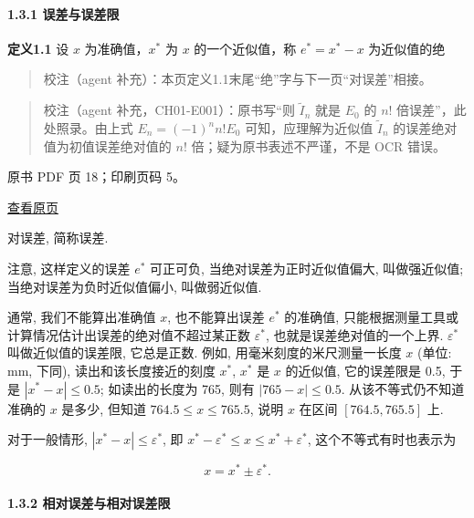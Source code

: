 \paragraph{1.3.1 误差与误差限}\label{ch01-ux8befux5deeux4e0eux8befux5deeux9650}

\textbf{定义1.1} 设 \(x\) 为准确值，\(x^*\) 为 \(x\) 的一个近似值，称 \(e^* = x^* - x\) 为近似值的绝

\begin{quote}
校注（agent 补充）：本页定义1.1末尾``绝''字与下一页``对误差''相接。
\end{quote}

\begin{quote}
校注（agent 补充，CH01-E001）：原书写``则 \(\tilde{I}_n\) 就是 \(E_0\) 的 \(n!\) 倍误差''，此处照录。由上式 \(E_n=(-1)^n n!E_0\) 可知，应理解为近似值 \(\tilde{I}_n\) 的误差绝对值为初值误差绝对值的 \(n!\) 倍；疑为原书表述不严谨，不是 OCR 错误。
\end{quote}

\clearpage

原书 PDF 页 18；印刷页码 5。

\href{source-images/pdf-018.jpeg}{查看原页}

对误差, 简称误差.

注意, 这样定义的误差 \(e^*\) 可正可负, 当绝对误差为正时近似值偏大, 叫做强近似值; 当绝对误差为负时近似值偏小, 叫做弱近似值.

通常, 我们不能算出准确值 \(x\), 也不能算出误差 \(e^*\) 的准确值, 只能根据测量工具或计算情况估计出误差的绝对值不超过某正数 \(\varepsilon^*\), 也就是误差绝对值的一个上界. \(\varepsilon^*\) 叫做近似值的误差限, 它总是正数. 例如, 用毫米刻度的米尺测量一长度 \(x\) (单位: mm, 下同), 读出和该长度接近的刻度 \(x^*\), \(x^*\) 是 \(x\) 的近似值, 它的误差限是 0.5, 于是 \(|x^* - x| \leqslant 0.5\); 如读出的长度为 765, 则有 \(|765 - x| \leqslant 0.5\). 从该不等式仍不知道准确的 \(x\) 是多少, 但知道 \(764.5 \leqslant x \leqslant 765.5\), 说明 \(x\) 在区间 \([764.5, 765.5]\) 上.

对于一般情形, \(|x^* - x| \leqslant \varepsilon^*\), 即 \(x^* - \varepsilon^* \leqslant x \leqslant x^* + \varepsilon^*\), 这个不等式有时也表示为

\[
x = x^* \pm \varepsilon^*.
\]

\paragraph{1.3.2 相对误差与相对误差限}\label{ch01-ux76f8ux5bf9ux8befux5deeux4e0eux76f8ux5bf9ux8befux5deeux9650}

